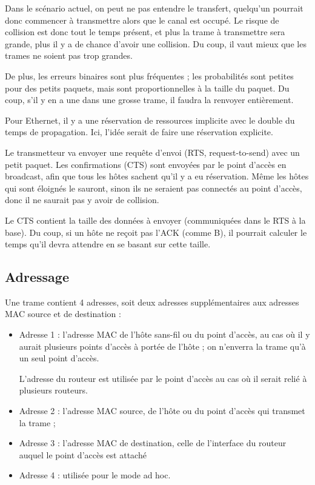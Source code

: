 		Dans le scénario actuel, on peut ne pas entendre le transfert, quelqu'un pourrait donc commencer à transmettre alors que le canal est occupé. Le risque de collision est donc tout le temps présent, et plus la trame à transmettre sera grande, plus il y a de chance d'avoir une collision. Du coup, il vaut mieux que les trames ne soient pas trop grandes.
		
		De plus, les erreurs binaires sont plus fréquentes ; les probabilités sont petites pour des petits paquets, mais sont proportionnelles à la taille du paquet. Du coup, s'il y en a une dans une grosse trame, il faudra la renvoyer entièrement.
		
		Pour Ethernet, il y a une réservation de ressources implicite avec le double du temps de propagation. Ici, l'idée serait de faire une réservation explicite. 
		
		
		Le transmetteur va envoyer une requête d'envoi (RTS, request-to-send) avec un petit paquet. Les confirmations (CTS) sont envoyées par le point d'accès en broadcast, afin que tous les hôtes sachent qu'il y a eu réservation. Même les hôtes qui sont éloignés le sauront, sinon ils ne seraient pas connectés au point d'accès, donc il ne saurait pas y avoir de collision.
		
		Le CTS contient la taille des données à envoyer (communiquées dans le RTS à la base). Du coup, si un hôte ne reçoit pas l'ACK (comme B), il pourrait calculer le temps qu'il devra attendre en se basant sur cette taille.
		
		\subsection{Adressage}
		
		
		Une trame contient 4 adresses, soit deux adresses supplémentaires aux adresses MAC source et de destination :
		
		\begin{itemize}
			\item Adresse 1 : l'adresse MAC de l'hôte sans-fil ou du point d'accès, au cas où il y aurait plusieurs points d'accès à portée de l'hôte ; on n'enverra la trame qu'à un seul point d'accès. 
						
			 L'adresse du routeur est utilisée par le point d'accès au cas où il serait relié à plusieurs routeurs.
			\item Adresse 2 : l'adresse MAC source, de l'hôte ou du point d'accès qui transmet la trame ;
			\item Adresse 3 : l'adresse MAC de destination, celle de l'interface du routeur auquel le point d'accès est attaché
			\item Adresse 4 : utilisée pour le mode ad hoc.
		\end{itemize}
		
